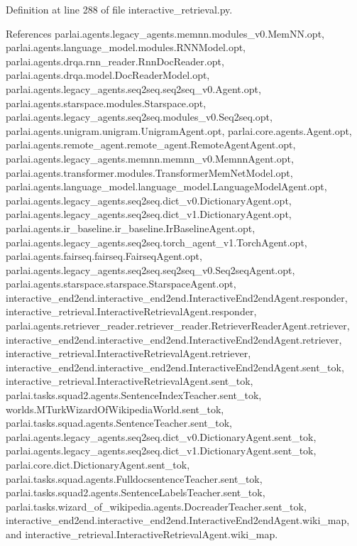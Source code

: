 Definition at line 288 of file interactive\+\_\+retrieval.\+py.



References parlai.\+agents.\+legacy\+\_\+agents.\+memnn.\+modules\+\_\+v0.\+Mem\+N\+N.\+opt, parlai.\+agents.\+language\+\_\+model.\+modules.\+R\+N\+N\+Model.\+opt, parlai.\+agents.\+drqa.\+rnn\+\_\+reader.\+Rnn\+Doc\+Reader.\+opt, parlai.\+agents.\+drqa.\+model.\+Doc\+Reader\+Model.\+opt, parlai.\+agents.\+legacy\+\_\+agents.\+seq2seq.\+seq2seq\+\_\+v0.\+Agent.\+opt, parlai.\+agents.\+starspace.\+modules.\+Starspace.\+opt, parlai.\+agents.\+legacy\+\_\+agents.\+seq2seq.\+modules\+\_\+v0.\+Seq2seq.\+opt, parlai.\+agents.\+unigram.\+unigram.\+Unigram\+Agent.\+opt, parlai.\+core.\+agents.\+Agent.\+opt, parlai.\+agents.\+remote\+\_\+agent.\+remote\+\_\+agent.\+Remote\+Agent\+Agent.\+opt, parlai.\+agents.\+legacy\+\_\+agents.\+memnn.\+memnn\+\_\+v0.\+Memnn\+Agent.\+opt, parlai.\+agents.\+transformer.\+modules.\+Transformer\+Mem\+Net\+Model.\+opt, parlai.\+agents.\+language\+\_\+model.\+language\+\_\+model.\+Language\+Model\+Agent.\+opt, parlai.\+agents.\+legacy\+\_\+agents.\+seq2seq.\+dict\+\_\+v0.\+Dictionary\+Agent.\+opt, parlai.\+agents.\+legacy\+\_\+agents.\+seq2seq.\+dict\+\_\+v1.\+Dictionary\+Agent.\+opt, parlai.\+agents.\+ir\+\_\+baseline.\+ir\+\_\+baseline.\+Ir\+Baseline\+Agent.\+opt, parlai.\+agents.\+legacy\+\_\+agents.\+seq2seq.\+torch\+\_\+agent\+\_\+v1.\+Torch\+Agent.\+opt, parlai.\+agents.\+fairseq.\+fairseq.\+Fairseq\+Agent.\+opt, parlai.\+agents.\+legacy\+\_\+agents.\+seq2seq.\+seq2seq\+\_\+v0.\+Seq2seq\+Agent.\+opt, parlai.\+agents.\+starspace.\+starspace.\+Starspace\+Agent.\+opt, interactive\+\_\+end2end.\+interactive\+\_\+end2end.\+Interactive\+End2end\+Agent.\+responder, interactive\+\_\+retrieval.\+Interactive\+Retrieval\+Agent.\+responder, parlai.\+agents.\+retriever\+\_\+reader.\+retriever\+\_\+reader.\+Retriever\+Reader\+Agent.\+retriever, interactive\+\_\+end2end.\+interactive\+\_\+end2end.\+Interactive\+End2end\+Agent.\+retriever, interactive\+\_\+retrieval.\+Interactive\+Retrieval\+Agent.\+retriever, interactive\+\_\+end2end.\+interactive\+\_\+end2end.\+Interactive\+End2end\+Agent.\+sent\+\_\+tok, interactive\+\_\+retrieval.\+Interactive\+Retrieval\+Agent.\+sent\+\_\+tok, parlai.\+tasks.\+squad2.\+agents.\+Sentence\+Index\+Teacher.\+sent\+\_\+tok, worlds.\+M\+Turk\+Wizard\+Of\+Wikipedia\+World.\+sent\+\_\+tok, parlai.\+tasks.\+squad.\+agents.\+Sentence\+Teacher.\+sent\+\_\+tok, parlai.\+agents.\+legacy\+\_\+agents.\+seq2seq.\+dict\+\_\+v0.\+Dictionary\+Agent.\+sent\+\_\+tok, parlai.\+agents.\+legacy\+\_\+agents.\+seq2seq.\+dict\+\_\+v1.\+Dictionary\+Agent.\+sent\+\_\+tok, parlai.\+core.\+dict.\+Dictionary\+Agent.\+sent\+\_\+tok, parlai.\+tasks.\+squad.\+agents.\+Fulldocsentence\+Teacher.\+sent\+\_\+tok, parlai.\+tasks.\+squad2.\+agents.\+Sentence\+Labels\+Teacher.\+sent\+\_\+tok, parlai.\+tasks.\+wizard\+\_\+of\+\_\+wikipedia.\+agents.\+Docreader\+Teacher.\+sent\+\_\+tok, interactive\+\_\+end2end.\+interactive\+\_\+end2end.\+Interactive\+End2end\+Agent.\+wiki\+\_\+map, and interactive\+\_\+retrieval.\+Interactive\+Retrieval\+Agent.\+wiki\+\_\+map.



